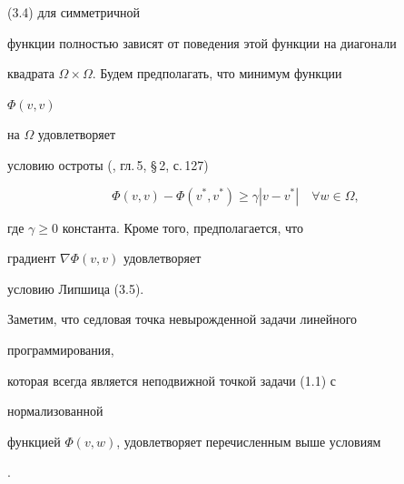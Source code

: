 (3.4) для симметричной


функции полностью зависят от поведения этой функции на диагонали


квадрата $\Omega\times\Omega$. Будем предполагать, что минимум функции


$\Phi(v,v)$


на $\Omega$ удовлетворяет


условию остроты (\cite{Pol}, гл.\,5, \S\,2, с.\,127)


\begin{equation}


\Phi(v,v)-\Phi(v^*,v^*)\ge \gamma|v-v^*|\quad \forall w\in \Omega,


\end{equation}


где $\gamma\ge 0$ константа. Кроме того, предполагается, что


градиент $\nabla\Phi(v,v)$ удовлетворяет


условию Липшица (3.5).





Заметим, что седловая точка невырожденной задачи линейного


программирования,


которая всегда является неподвижной точкой задачи (1.1) с


нормализованной


функцией $\Phi(v,w)$, удовлетворяет перечисленным выше условиям


\cite{A2}.





